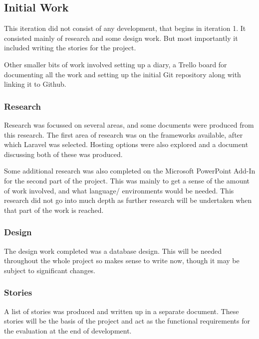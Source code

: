 \subsection{Initial Work}
This iteration did not consist of any development, that begins in iteration 1. It consisted mainly of research and some design work. But most importantly it included writing the stories for the project. 

Other smaller bits of work involved setting up a diary, a Trello board for documenting all the work and setting up the initial Git repository along with linking it to Github.
\subsubsection{Research}
Research was focussed on several areas, and some documents were produced from this research. The first area of research was on the frameworks available, after which Laravel was selected. Hosting options were also explored and a document discussing both of these was produced.

Some additional research was also completed on the Microsoft PowerPoint Add-In for the second part of the project. This was mainly to get a sense of the amount of work involved, and what language/ environments would be needed. This research did not go into much depth as further research will be undertaken when that part of the work is reached.
\subsubsection{Design}
The design work completed was a database design. This will be needed throughout the whole project so makes sense to write now, though it may be subject to significant changes.
\subsubsection{Stories}
A list of stories was produced and written up in a separate document. These stories will be the basis of the project and act as the functional requirements for the evaluation at the end of development.
\newpage
